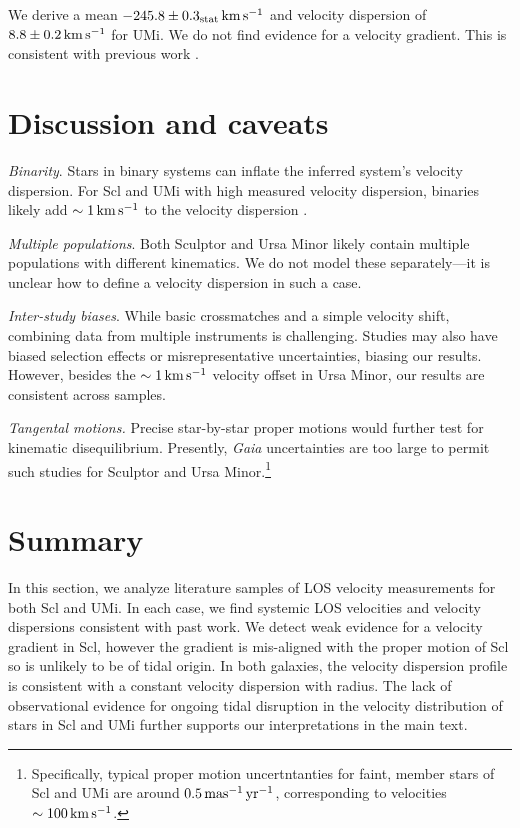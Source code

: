 We derive a mean \(-245.8\pm0.3_{\rm stat}\,{\rm km\,s^{-1}}\) and velocity
dispersion of \(8.8\pm0.2\,{\rm km\,s^{-1}}\) for UMi. We do not find evidence for a
velocity gradient. This is consistent with previous work
\citetext{\citealp{pace+2020}; \citealp[somewhat
with][]{spencer+2018}; \citealp{martinez-garcia+2023}}.

\section{Discussion and caveats}\label{discussion-and-caveats}

\emph{Binarity}. Stars in binary systems can inflate the inferred
system's velocity dispersion. For Scl and UMi with high measured
velocity dispersion, binaries likely add \(\sim 1\,{\rm km\,s^{-1}}\) to the
velocity dispersion \citep{spencer+2018, gration+2025}.

\emph{Multiple populations}. Both Sculptor and Ursa Minor likely contain
multiple populations with different kinematics\citep[\citet{pace+2020},
\citet{tolstoy+2004}]{arroyo-polonio+2024}. We do not model these
separately---it is unclear how to define a velocity dispersion in such a
case.

\emph{Inter-study biases}. While basic crossmatches and a simple
velocity shift, combining data from multiple instruments is challenging.
Studies may also have biased selection effects or misrepresentative
uncertainties, biasing our results. However, besides the \(\sim1\,{\rm km\,s^{-1}}\)
velocity offset in Ursa Minor, our results are consistent across
samples.

\emph{Tangental motions.} Precise star-by-star proper motions would
further test for kinematic disequilibrium. Presently, \emph{Gaia}
uncertainties are too large to permit such studies for Sculptor and Ursa
Minor.\footnote{Specifically, typical proper motion uncertntanties for
  faint, member stars of Scl and UMi are around \(0.5\,{\rm mas^{-1}\,yr^{-1}}\),
  corresponding to velocities \(\sim 100\,{\rm km\,s^{-1}}\).}

\section{Summary}\label{summary}

In this section, we analyze literature samples of LOS velocity
measurements for both Scl and UMi. In each case, we find systemic LOS
velocities and velocity dispersions consistent with past work. We detect
weak evidence for a velocity gradient in Scl, however the gradient is
mis-aligned with the proper motion of Scl so is unlikely to be of tidal
origin. In both galaxies, the velocity dispersion profile is consistent
with a constant velocity dispersion with radius. The lack of
observational evidence for ongoing tidal disruption in the velocity
distribution of stars in Scl and UMi further supports our
interpretations in the main text.
